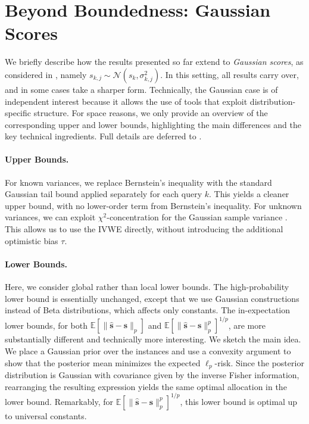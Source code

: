 \documentclass{article}
\def\vs{{\bm{s}}}
\theoremstyle{plain}
\theoremstyle{definition}
\theoremstyle{plain}
\newcommand{\ivwe}{\textsc{IVWE}}
\begin{document}
\section{Beyond Boundedness: Gaussian Scores}

We briefly describe how the results presented so far extend to \emph{Gaussian scores}, as considered in \citep{saha2026budget}, namely \(s_{k,j} \sim \mathcal{N}(s_k,\sigma_{k,j}^2)\). In this setting, all results carry over, and in some cases take a sharper form. Technically, the Gaussian case is of independent interest because it allows the use of tools that exploit distribution-specific structure. For space reasons, we only provide an overview of the corresponding upper and lower bounds, highlighting the main differences and the key technical ingredients. Full details are deferred to .

\paragraph{Upper Bounds.} 
For known variances, we replace Bernstein's inequality with the standard Gaussian tail bound applied separately for each query $k$. This yields a cleaner upper bound, with no lower-order term from Bernstein's inequality. For unknown variances, we can exploit \(\chi^2\)-concentration for the Gaussian sample variance \citep[Eq.~(4.4)]{laurent-massart}. This allows us to use the \ivwe{} directly, without introducing the additional optimistic bias \(\tau\).

\paragraph{Lower Bounds.} Here, we consider global rather than local lower bounds. The high-probability lower bound is essentially unchanged, except that we use Gaussian constructions instead of Beta distributions, which affects only constants. The in-expectation lower bounds, for both \(\mathbb{E}[\|\hat{\vs}-\vs\|_p]\) and \(\mathbb{E}[\|\hat{\vs}-\vs\|_p^p]^{1/p}\), are more substantially different and technically more interesting. We sketch the main idea. We place a Gaussian prior over the instances and use a convexity argument to show that the posterior mean minimizes the expected \(\ell_p\)-risk. Since the posterior distribution is Gaussian with covariance given by the inverse Fisher information, rearranging the resulting expression yields the same optimal allocation in the lower bound. Remarkably, for \(\mathbb{E}[\|\hat{\vs}-\vs\|_p^p]^{1/p}\), this lower bound is optimal up to universal constants.
\end{document}
